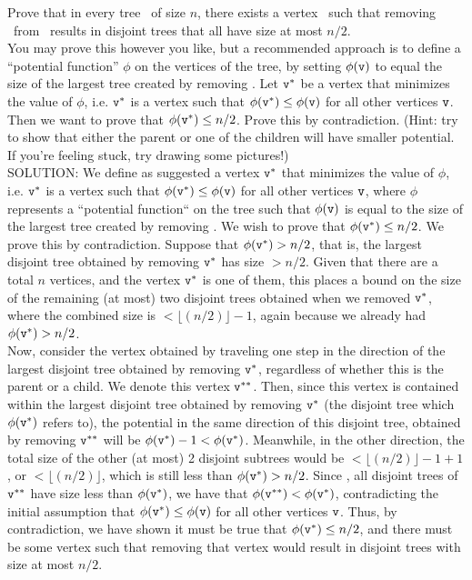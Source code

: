 \documentclass[11pt]{article}
\begin{document}
\begin{enumerate}
\begin{enumerate}
  Prove that in every tree \treeT\ of size $n$, there exists a vertex \btv\ such that removing \btv\ from \treeT\ results in disjoint trees that all have size at most $n/2$.  \\
  
  You may prove this however you like, but a recommended approach is to define a ``potential function'' $\phi$ on the vertices of the tree, by setting $\phi(\texttt{v})$ to equal the size of the largest tree created by removing \btv.  Let $\texttt{v}^*$ be a vertex that minimizes the value of $\phi$, i.e. $\texttt{v}^*$ is a vertex such that $\phi(\texttt{v}^*) \le \phi(\texttt{v})$ for all other vertices $\texttt{v}$. Then we want to prove that $\phi(\texttt{v}^*)\leq n/2$.  Prove this by contradiction.  (Hint: try to show that either the parent or one of the children will have smaller potential. If you're feeling stuck, try drawing some pictures!) \\
  
  SOLUTION: We define as suggested a vertex $\texttt{v}^*$ that minimizes the value of $\phi$, i.e. $\texttt{v}^*$ is a vertex such that $\phi(\texttt{v}^*) \le \phi(\texttt{v})$ for all other vertices $\texttt{v}$, where $\phi$ represents a ``potential function`` on the tree such that $\phi(\texttt{v})$ is equal to the size of the largest tree created by removing \btv. We wish to prove that  $\phi(\texttt{v}^*)\leq n/2$. We prove this by contradiction. Suppose that $\phi(\texttt{v}^*) > n/2$, that is, the largest disjoint tree obtained by removing $\texttt{v}^*$ has size $ > n/2$. Given that there are a total $n$ vertices, and the vertex $\texttt{v}^*$ is one of them, this places a bound on the size of the remaining (at most) two disjoint trees obtained when we removed $\texttt{v}^*$, where the combined size is $ < \lfloor(n/2)\rfloor - 1$, again because we already had $\phi(\texttt{v}^*) > n/2$. \\
  
  Now, consider the vertex obtained by traveling one step in the direction of the largest disjoint tree obtained by removing $\texttt{v}^*$, regardless of whether this is the parent or a child. We denote this vertex $\texttt{v}^{**}$. Then, since this vertex is contained within the largest disjoint tree obtained by removing $\texttt{v}^*$ (the disjoint tree which $\phi(\texttt{v}^*)$ refers to), the potential in the same direction of this disjoint tree, obtained by removing $\texttt{v}^{**}$ will be $\phi(\texttt{v}^*) - 1 < \phi(\texttt{v}^*)$. Meanwhile, in the other direction, the total size of the other (at most) 2 disjoint subtrees would be $ < \lfloor(n/2)\rfloor - 1 + 1$, or $ < \lfloor(n/2)\rfloor$, which is still less than $\phi(\texttt{v}^*) > n/2$. Since , all disjoint trees of $\texttt{v}^{**}$ have size less than $\phi(\texttt{v}^*)$, we have that $\phi(\texttt{v}^{**}) < \phi(\texttt{v}^*)$, contradicting the initial assumption that $\phi(\texttt{v}^*) \le \phi(\texttt{v})$ for all other vertices $\texttt{v}$. Thus, by contradiction, we have shown it must be true that $\phi(\texttt{v}^*)\leq n/2$, and there must be some vertex such that removing that vertex would result in disjoint trees with size at most $n/2$. \\
 

\end{enumerate}
\end{enumerate}
\end{document}
